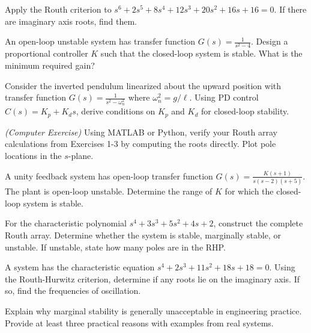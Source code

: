 \begin{exercise}
Apply the Routh criterion to $s^6 + 2s^5 + 8s^4 + 12s^3 + 20s^2 + 16s + 16 = 0$. If there are imaginary axis roots, find them.
\end{exercise}

\begin{exercise}
An open-loop unstable system has transfer function $G(s) = \frac{1}{s^2 - 4}$. Design a proportional controller $K$ such that the closed-loop system is stable. What is the minimum required gain?
\end{exercise}

\begin{exercise}
Consider the inverted pendulum linearized about the upward position with transfer function $G(s) = \frac{1}{s^2 - \omega_n^2}$ where $\omega_n^2 = g/\ell$. Using PD control $C(s) = K_p + K_d s$, derive conditions on $K_p$ and $K_d$ for closed-loop stability.
\end{exercise}

\begin{exercise}
\textit{(Computer Exercise)} Using MATLAB or Python, verify your Routh array calculations from Exercises 1-3 by computing the roots directly. Plot pole locations in the $s$-plane.
\end{exercise}

\begin{exercise}
A unity feedback system has open-loop transfer function $G(s) = \frac{K(s+1)}{s(s-2)(s+5)}$. The plant is open-loop unstable. Determine the range of $K$ for which the closed-loop system is stable.
\end{exercise}

\begin{exercise}
For the characteristic polynomial $s^4 + 3s^3 + 5s^2 + 4s + 2$, construct the complete Routh array. Determine whether the system is stable, marginally stable, or unstable. If unstable, state how many poles are in the RHP.
\end{exercise}

\begin{exercise}
A system has the characteristic equation $s^4 + 2s^3 + 11s^2 + 18s + 18 = 0$. Using the Routh-Hurwitz criterion, determine if any roots lie on the imaginary axis. If so, find the frequencies of oscillation.
\end{exercise}

\begin{exercise}
Explain why marginal stability is generally unacceptable in engineering practice. Provide at least three practical reasons with examples from real systems.
\end{exercise}

